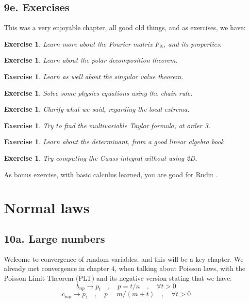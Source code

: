 \documentclass[12pt]{amsbook}
\newtheorem{exercise}[theorem]{Exercise}
\begin{document}
\section*{9e. Exercises}

This was a very enjoyable chapter, all good old things, and as exercises, we have:

\begin{exercise}
Learn more about the Fourier matrix $F_N$, and its properties.
\end{exercise}

\begin{exercise}
Learn about the polar decomposition theorem.
\end{exercise}

\begin{exercise}
Learn as well about the singular value theorem.
\end{exercise}

\begin{exercise}
Solve some physics equations using the chain rule.
\end{exercise}

\begin{exercise}
Clarify what we said, regarding the local extrema.
\end{exercise}

\begin{exercise}
Try to find the multivariable Taylor formula, at order 3.
\end{exercise}

\begin{exercise}
Learn about the determinant, from a good linear algebra book.
\end{exercise}

\begin{exercise}
Try computing the Gauss integral without using 2D.
\end{exercise}

As bonus exercise, with basic calculus learned, you are good for Rudin \cite{rud}.

\chapter{Normal laws}

\section*{10a. Large numbers}

Welcome to convergence of random variables, and this will be a key chapter. We already met convergence in chapter 4, when talking about Poisson laws, with the Poisson Limit Theorem (PLT) and its negative version stating that we have:
$$b_{np}\to p_t\quad,\quad p=t/n\quad ,\quad \forall t>0$$
$$c_{mp}\to p_t\quad,\quad p=m/(m+t)\quad,\quad \forall t>0$$
\end{document}
